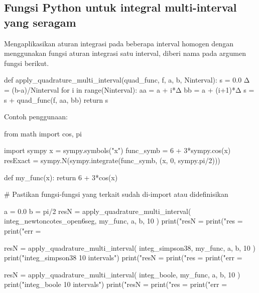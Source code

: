 \subsection*{Fungsi Python untuk integral multi-interval yang seragam}

Mengaplikasikan aturan integrasi pada beberapa interval homogen
dengan menggunakan fungsi aturan integrasi satu interval, diberi nama
 pada argumen fungsi berikut.
\begin{fullwidth}
\begin{pythoncode}
def apply_quadrature_multi_interval(quad_func, f, a, b, Ninterval):
    s = 0.0
    Δ = (b-a)/Ninterval
    for i in range(Ninterval):
        aa = a + i*Δ
        bb = a + (i+1)*Δ
        s = s + quad_func(f, aa, bb)
    return s
\end{pythoncode}
\end{fullwidth}

Contoh penggunaan:
\begin{fullwidth}
\begin{pythoncode}
from math import cos, pi

import sympy
x = sympy.symbols("x")
func_symb = 6 + 3*sympy.cos(x)
resExact = sympy.N(sympy.integrate(func_symb, (x, 0, sympy.pi/2)))

def my_func(x):
    return 6 + 3*cos(x)

# Pastikan fungsi-fungsi yang terkait sudah di-import atau didefinisikan

a = 0.0
b = pi/2
resN = apply_quadrature_multi_interval(
    integ_newtoncotes_open6seg, my_func, a, b, 10
)
print("resN = %
print("res  = %
print("err  = %

resN = apply_quadrature_multi_interval(
    integ_simpson38, my_func, a, b, 10
)
print("\nUsing integ_simpson38 10 intervals")
print("resN = %
print("res  = %
print("err  = %

resN = apply_quadrature_multi_interval(
    integ_boole, my_func, a, b, 10
)
print("\nUsing integ_boole 10 intervals")
print("resN = %
print("res  = %
print("err  = %
\end{pythoncode}
\end{fullwidth}


